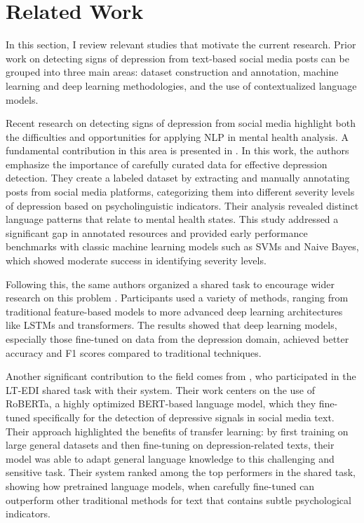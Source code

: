 \section{Related Work}

In this section, I review relevant studies that motivate the current research. Prior work on detecting signs of depression from text-based social media posts can be grouped into three main areas: dataset construction and annotation, machine learning and deep learning methodologies, and the use of contextualized language models.

Recent research on detecting signs of depression from social media highlight both the difficulties and opportunities for applying NLP in mental health analysis. A fundamental contribution in this area is presented in \cite{Kayalvizhi_2022_Dataset}. In this work, the authors emphasize the importance of carefully curated data for effective depression detection. They create a labeled dataset by extracting and manually annotating posts from social media platforms, categorizing them into different severity levels of depression based on psycholinguistic indicators. Their analysis revealed distinct language patterns that relate to mental health states. This study addressed a significant gap in annotated resources and provided early performance benchmarks with classic machine learning models such as SVMs and Naive Bayes, which showed moderate success in identifying severity levels.

Following this, the same authors organized a shared task to encourage wider research on this problem \cite{Kayalvizhi_2022_Findings}. Participants used a variety of methods, ranging from traditional feature-based models to more advanced deep learning architectures like LSTMs and transformers. The results showed that deep learning models, especially those fine-tuned on data from the depression domain, achieved better accuracy and F1 scores compared to traditional techniques.

Another significant contribution to the field comes from \cite{Poswiata_2022}, who participated in the LT-EDI shared task with their system. Their work centers on the use of RoBERTa, a highly optimized BERT-based language model, which they fine-tuned specifically for the detection of depressive signals in social media text. Their approach highlighted the benefits of transfer learning: by first training on large general datasets and then fine-tuning on depression-related texts, their model was able to adapt general language knowledge to this challenging and sensitive task. Their system ranked among the top performers in the shared task, showing how pretrained language models, when carefully fine-tuned can outperform other traditional methods for text that contains subtle psychological indicators.

